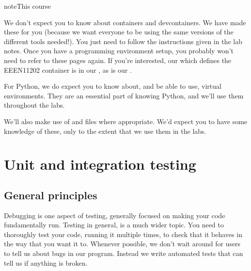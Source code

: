 \documentclass[letterpaper,10pt,british]{sphinxmanual}
\begin{document}
\begin{sphinxadmonition}{note}{This course}

\sphinxAtStartPar
We don’t expect you to know about containers and devcontainers. We have made these for you (because we want everyone to be using the same versions of the different tools needed!). You just need to follow the instructions given in the lab notes. Once you have a programming environment setup, you probably won’t need to refer to these pages again. If you’re interested, our  which defines the EEEN11202 container is in our , as is our .

\sphinxAtStartPar
For Python, we do expect you to know about, and be able to use, virtual environments. They are an essential part of knowing Python, and we’ll use them throughout the labs.

\sphinxAtStartPar
We’ll also make use of  and  files where appropriate. We’d expect you to have some knowledge of these, only to the extent that we use them in the labs.
\end{sphinxadmonition}

\sphinxstepscope


\section{Unit and integration testing}
\label{\detokenize{chapters/software_development_tools/automated_testing:unit-and-integration-testing}}\label{\detokenize{chapters/software_development_tools/automated_testing:automated-testing}}\label{\detokenize{chapters/software_development_tools/automated_testing::doc}}

\subsection{General principles}
\label{\detokenize{chapters/software_development_tools/automated_testing:general-principles}}
\sphinxAtStartPar
Debugging is one aspect of testing, generally focused on making your code fundamentally run. Testing in general, is a much wider topic. You need to thoroughly test your code, running it multiple times, to check that it behaves in the way that you want it to. Whenever possible, we don’t wait around for users to tell us about bugs in our program. Instead we write automated tests that can tell us if anything is broken.
\end{document}
